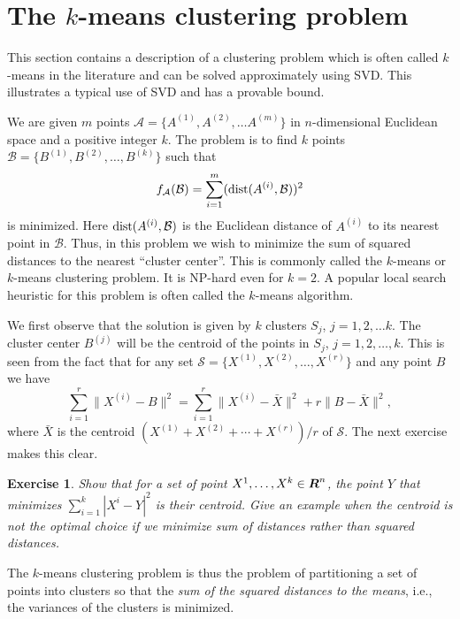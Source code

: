 \documentclass{book}
\newtheorem{exercise}{Exercise}
\numberwithin{exercise}{chapter}
\begin{document}
\section{The $k$-means clustering problem}

This section contains a description of a clustering problem which is often called $k$-means in the literature and
can be solved approximately using SVD. This illustrates a
typical use of SVD and has a provable bound.

We are given $m$ points ${\mathcal A}=\{A^{(1)},A^{(2)},\ldots A^{(m)}\}$
in $n$-dimensional Euclidean space and a positive integer $k$.
The problem is to find $k$ points
${\mathcal B}=\{B^{(1)},B^{(2)},\ldots,B^{(k)}\}$ such that
$$f_{{\mathcal A}}({\mathcal B}) = \sum_{i=1}^m (\hbox{dist}(A^{(i)},{\mathcal B}))^2$$
is minimized. Here $\hbox{dist}(A^{(i)},{\mathcal B})$
is the Euclidean distance of $A^{(i)}$ to its nearest point in ${\mathcal B}$. Thus,
in this problem we wish to minimize the sum of squared distances to the nearest
``cluster center''.  This is commonly called the $k$-means or $k$-means clustering problem.
It is NP-hard even for $k=2$. A popular local search heuristic for this problem is often called the $k$-means algorithm.  

We first observe that the solution is given by $k$ clusters $S_j$, $j=1,2,\ldots k$. The
cluster center $B^{(j)}$ will be the centroid
of the points in $S_j$, $j=1,2,\ldots,k$. This is seen from the fact that for any set
${\mathcal S}=\{X^{(1)},X^{(2)},\ldots,X^{(r)}\}$ and any point $B$ we have
\begin{equation}\label{99}
\sum_{i=1}^r \|X^{(i)}-B\|^2=\sum_{i=1}^r \|X^{(i)}-\bar{X}\|^2+r\|B-\bar{X}\|^2,
\end{equation}
where $\bar{X}$ is the centroid $(X^{(1)}+X^{(2)}+\cdots+X^{(r)})/r$ of ${\mathcal S}$. The next exercise makes this clear.

\begin{exercise}
Show that for a set of point $X^1, \ldots, X^k \in \mbox{\mbox{\boldmath $R$}}^n$, the point $Y$ that
minimizes $\sum_{i=1}^k |X^i - Y|^2$ is their centroid. Give an example when the centroid is not the optimal choice if we minimize sum of distances rather than squared distances.
\end{exercise}

The $k$-means clustering 
problem is thus the problem of partitioning a set of points into clusters
so that the {\em sum of the squared distances to the means}, i.e., the variances of the clusters is minimized.
\end{document}
